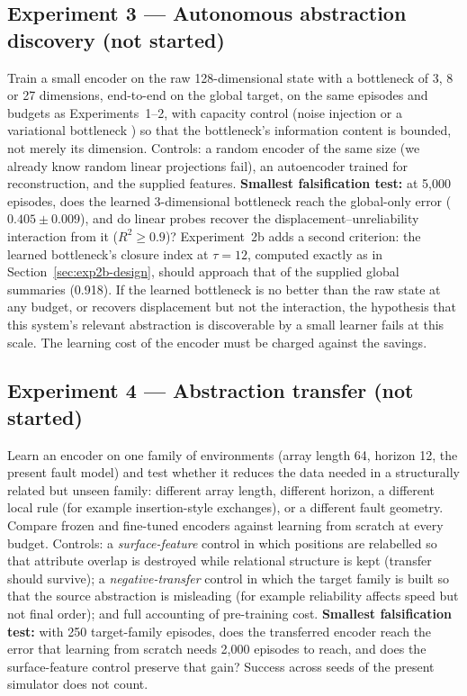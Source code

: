 \documentclass[11pt,a4paper]{article}
\begin{document}
\subsection{Experiment 3 --- Autonomous abstraction discovery (not started)}
Train a small encoder on the raw 128-dimensional state with a bottleneck of 3,
8 or 27 dimensions, end-to-end on the global target, on the same episodes and
budgets as Experiments~1--2, with capacity control (noise injection or a
variational bottleneck \citep{alemi2017}) so that the bottleneck's information
content is bounded, not merely its dimension. Controls: a random encoder of the
same size (we already know random linear projections fail), an autoencoder
trained for reconstruction, and the supplied features. \textbf{Smallest
falsification test:} at 5,000 episodes, does the learned 3-dimensional
bottleneck reach the global-only error ($0.405\pm0.009$), and do linear probes
recover the displacement--unreliability interaction from it ($R^2\ge0.9$)?
Experiment~2b adds a second criterion: the learned bottleneck's closure index
at $\tau=12$, computed exactly as in Section~\ref{sec:exp2b-design}, should
approach that of the supplied global summaries (0.918). If
the learned bottleneck is no better than the raw state at any budget, or
recovers displacement but not the interaction, the hypothesis that this
system's relevant abstraction is discoverable by a small learner fails at this
scale. The learning cost of the encoder must be charged against the savings.

\subsection{Experiment 4 --- Abstraction transfer (not started)}
Learn an encoder on one family of environments (array length 64, horizon 12,
the present fault model) and test whether it reduces the data needed in a
structurally related but unseen family: different array length, different
horizon, a different local rule (for example insertion-style exchanges), or a
different fault geometry. Compare frozen and fine-tuned encoders against
learning from scratch at every budget. Controls: a \emph{surface-feature}
control in which positions are relabelled so that attribute overlap is
destroyed while relational structure is kept (transfer should survive); a
\emph{negative-transfer} control in which the target family is built so that
the source abstraction is misleading (for example reliability affects speed but
not final order); and full accounting of pre-training cost. \textbf{Smallest
falsification test:} with 250 target-family episodes, does the transferred
encoder reach the error that learning from scratch needs 2,000 episodes to
reach, and does the surface-feature control preserve that gain? Success across
seeds of the present simulator does not count.
\end{document}
